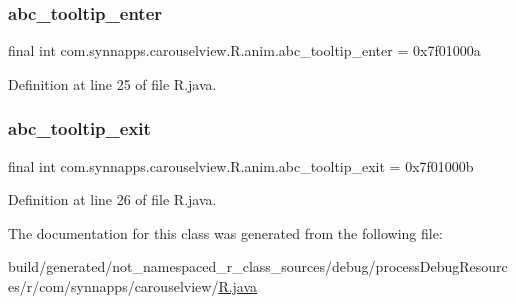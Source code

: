 \subsubsection{\texorpdfstring{abc\_tooltip\_enter}{abc\_tooltip\_enter}}
{\footnotesize\ttfamily final int com.\+synnapps.\+carouselview.\+R.\+anim.\+abc\+\_\+tooltip\+\_\+enter = 0x7f01000a\hspace{0.3cm}{\ttfamily [static]}}



Definition at line 25 of file R.\+java.

\mbox{\label{classcom_1_1synnapps_1_1carouselview_1_1_r_1_1anim_a7a33a5e2bc46edc4c3a9b3824929ea03}} 
\subsubsection{\texorpdfstring{abc\_tooltip\_exit}{abc\_tooltip\_exit}}
{\footnotesize\ttfamily final int com.\+synnapps.\+carouselview.\+R.\+anim.\+abc\+\_\+tooltip\+\_\+exit = 0x7f01000b\hspace{0.3cm}{\ttfamily [static]}}



Definition at line 26 of file R.\+java.



The documentation for this class was generated from the following file\+:\begin{DoxyCompactItemize}
\item 
build/generated/not\+\_\+namespaced\+\_\+r\+\_\+class\+\_\+sources/debug/process\+Debug\+Resources/r/com/synnapps/carouselview/\mbox{\hyperlink{com_2synnapps_2carouselview_2_r_8java}{R.\+java}}\end{DoxyCompactItemize}
